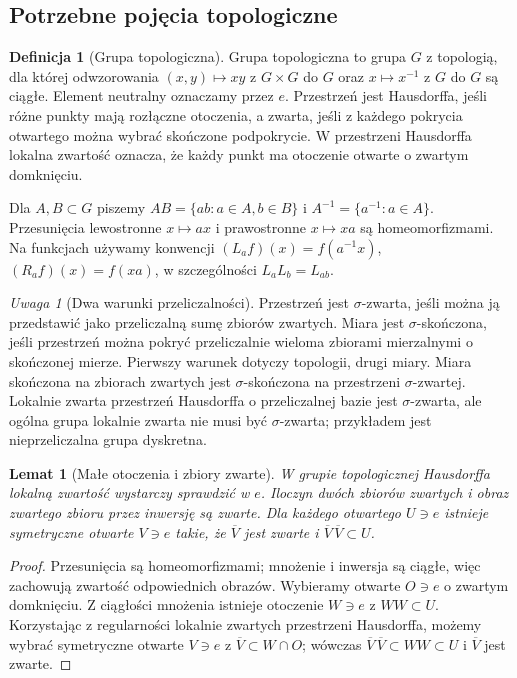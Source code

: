\documentclass[11pt,a4paper]{article}
\numberwithin{equation}{section}
\theoremstyle{plain}
\newtheorem{lemat}[twierdzenie]{Lemat}
\theoremstyle{definition}
\newtheorem{definicja}[twierdzenie]{Definicja}
\theoremstyle{remark}
\newtheorem{uwaga}[twierdzenie]{Uwaga}
\begin{document}
\subsection*{Potrzebne pojęcia topologiczne}
\begin{definicja}[Grupa topologiczna]
Grupa topologiczna to grupa $G$ z topologią, dla której odwzorowania $(x,y)\mapsto xy$ z $G\times G$ do $G$ oraz $x\mapsto x^{-1}$ z $G$ do $G$ są ciągłe. Element neutralny oznaczamy przez $e$. Przestrzeń jest Hausdorffa, jeśli różne punkty mają rozłączne otoczenia, a zwarta, jeśli z każdego pokrycia otwartego można wybrać skończone podpokrycie. W przestrzeni Hausdorffa lokalna zwartość oznacza, że każdy punkt ma otoczenie otwarte o zwartym domknięciu.
\end{definicja}
Dla $A,B\subset G$ piszemy $AB=\{ab:a\in A,b\in B\}$ i $A^{-1}=\{a^{-1}:a\in A\}$. Przesunięcia lewostronne $x\mapsto ax$ i prawostronne $x\mapsto xa$ są homeomorfizmami. Na funkcjach używamy konwencji $(L_af)(x)=f(a^{-1}x)$, $(R_af)(x)=f(xa)$, w szczególności $L_aL_b=L_{ab}$.
\begin{uwaga}[Dwa warunki przeliczalności]
Przestrzeń jest $\sigma$-zwarta, jeśli można ją przedstawić jako przeliczalną sumę zbiorów zwartych. Miara jest $\sigma$-skończona, jeśli przestrzeń można pokryć przeliczalnie wieloma zbiorami mierzalnymi o skończonej mierze. Pierwszy warunek dotyczy topologii, drugi miary. Miara skończona na zbiorach zwartych jest $\sigma$-skończona na przestrzeni $\sigma$-zwartej. Lokalnie zwarta przestrzeń Hausdorffa o przeliczalnej bazie jest $\sigma$-zwarta, ale ogólna grupa lokalnie zwarta nie musi być $\sigma$-zwarta; przykładem jest nieprzeliczalna grupa dyskretna.
\end{uwaga}
\begin{lemat}[Małe otoczenia i zbiory zwarte]
W grupie topologicznej Hausdorffa lokalną zwartość wystarczy sprawdzić w $e$. Iloczyn dwóch zbiorów zwartych i obraz zwartego zbioru przez inwersję są zwarte. Dla każdego otwartego $U\ni e$ istnieje symetryczne otwarte $V\ni e$ takie, że $\overline V$ jest zwarte i $\overline V\,\overline V\subset U$.
\end{lemat}
\begin{proof}
Przesunięcia są homeomorfizmami; mnożenie i inwersja są ciągłe, więc zachowują zwartość odpowiednich obrazów. Wybieramy otwarte $O\ni e$ o zwartym domknięciu. Z ciągłości mnożenia istnieje otoczenie $W\ni e$ z $WW\subset U$. Korzystając z regularności lokalnie zwartych przestrzeni Hausdorffa, możemy wybrać symetryczne otwarte $V\ni e$ z $\overline V\subset W\cap O$; wówczas $\overline V\,\overline V\subset WW\subset U$ i $\overline V$ jest zwarte.
\end{proof}
\end{document}

